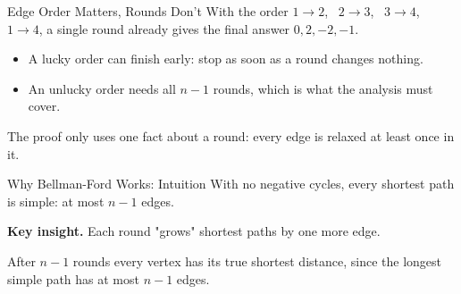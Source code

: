 \documentclass[10pt,aspectratio=169]{beamer}
\begin{document}
\begin{frame}{Edge Order Matters, Rounds Don't}
  With the order $1 \to 2$, \ $2 \to 3$, \ $3 \to 4$, \ $1 \to 4$, a single
  round already gives the final answer $0, 2, -2, -1$.

  \bigskip
  \begin{itemize}
    \item A lucky order can finish early: stop as soon as a round changes
          nothing.
    \item An unlucky order needs all $n - 1$ rounds, which is what the
          analysis must cover.
  \end{itemize}

  \pause
  \bigskip
  \begin{center}
    The proof only uses one fact about a round: \alert{every} edge is relaxed
    at least once in it.
  \end{center}
\end{frame}

\begin{frame}{Why Bellman-Ford Works: Intuition}
  With no negative cycles, every shortest path is \alert{simple}: at most $n-1$ edges.

  \bigskip
  \textbf{Key insight.} Each round "grows" shortest paths by one more edge.

  \bigskip
  \begin{center}
  \end{center}

  \bigskip
  After $n - 1$ rounds every vertex has its true shortest distance,
  since the longest simple path has at most $n - 1$ edges.
\end{frame}
\end{document}

